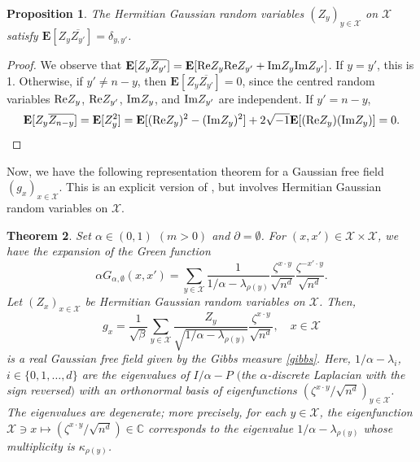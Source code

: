 \documentclass[a4paper,11pt]{article}
\theoremstyle{plain}
\newtheorem{theorem}{Theorem}[section]
\newtheorem{proposition}[theorem]{Proposition}
\theoremstyle{definition}
\begin{document}
\begin{proposition}\label{prop:hermite}
  The Hermitian Gaussian random variables $(Z_y)_{y\in\mathcal{X}}$
  on $\mathcal{X}$ satisfy
  $\mathbf{E}[Z_y\overline{Z_{y'}}]=\delta_{y,y'}$.
\end{proposition}

\begin{proof}
  We observe that
  $\mathbf{E}[Z_y\overline{Z_{y'}}]=
  \mathbf{E}[{\rm Re}Z_y{\rm Re}Z_{y'}+{\rm Im}Z_y{\rm Im}Z_{y'}]$.
  If $y=y'$, this is 1. Otherwise, if $y'\neq n-y$, then
  $\mathbf{E}[Z_y\overline{Z_{y'}}]=0$, since the centred
  random variables ${\rm Re}Z_y$, ${\rm Re}Z_{y'}$,
  ${\rm Im}Z_y$, and ${\rm Im}Z_{y'}$ are independent.
  If $y'= n-y$,
  \[
  \mathbf{E}[Z_y\overline{Z_{n-y}}]=\mathbf{E}[Z_y^2]=
  \mathbf{E}[({\rm Re}Z_y)^2-({\rm Im}Z_y)^2]+
  2\sqrt{-1}\mathbf{E}[({\rm Re}Z_y)({\rm Im}Z_y)]=0.
  \]  
\end{proof}

Now, we have the following representation theorem for
a Gaussian free field $(g_x)_{x\in\mathcal{X}}$.
This is an explicit version of \cite[Theorem~1.7]{BP25},
but involves Hermitian Gaussian random
variables on $\mathcal{X}$.

\begin{theorem}\label{thm:exp}
  Set $\alpha\in(0,1)$ $(m>0)$ and $\partial=\emptyset$.
  For $(x,x')\in \mathcal{X}\times\mathcal{X}$, we have
  the expansion of the Green function
  \begin{equation}\label{thm:exp1}
    \alpha G_{\alpha,\emptyset}(x,x')=
    \sum_{y\in\mathcal{X}}
    \frac{1}{1/\alpha-\lambda_{\rho(y)}}
    \frac{\zeta^{x\cdot y}}{\sqrt{n^d}}
    \frac{\zeta^{-x'\cdot y}}{\sqrt{n^d}}.
  \end{equation}
  Let $(Z_x)_{x\in \mathcal{X}}$ be
  Hermitian Gaussian random variables on $\mathcal{X}$.
  Then,
  \begin{equation}\label{thm:exp2}
    g_x=\frac{1}{\sqrt{\beta}}\sum_{y\in \mathcal{X}}
    \frac{Z_{y}}{\sqrt{1/\alpha-\lambda_{\rho(y)}}}
    \frac{\zeta^{x\cdot y}}{\sqrt{n^d}},
    \quad x\in\mathcal{X}
  \end{equation}
  is a real Gaussian free field given
  by the Gibbs measure \eqref{gibbs}. Here,
  $1/\alpha-\lambda_i$, $i\in\{0,1,\ldots,d\}$
  are the eigenvalues of $I/\alpha-P$
  $($the $\alpha$-discrete Laplacian with the sign
  reversed$)$ with an orthonormal basis of eigenfunctions
  $(\zeta^{x\cdot y}/\sqrt{n^d})_{y\in \mathcal{X}}$.
  The eigenvalues are degenerate; more precisely,
  for each $y\in\mathcal{X}$, the eigenfunction
  $\mathcal{X}\ni x\mapsto (\zeta^{x\cdot y}/\sqrt{n^d})\in\mathbb{C}$
  corresponds to the eigenvalue
  $1/\alpha-\lambda_{\rho(y)}$ whose multiplicity is
  $\kappa_{\rho(y)}$.
\end{theorem}
\end{document}

